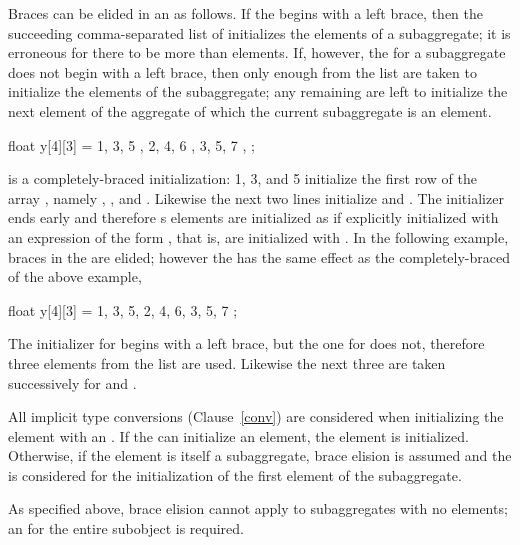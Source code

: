 \pnum
Braces can be elided in an
as follows.
If the
begins with a left brace,
then the succeeding comma-separated list of
initializes the elements of a subaggregate;
it is erroneous for there to be more
than elements.
If, however, the
for a subaggregate does not begin with a left brace,
then only enough
from the list are taken to initialize the elements of the subaggregate;
any remaining
are left to initialize the next element of the aggregate
of which the current subaggregate is an element.
\begin{example}

\begin{codeblock}
float y[4][3] = {
  { 1, 3, 5 },
  { 2, 4, 6 },
  { 3, 5, 7 },
};
\end{codeblock}

is a completely-braced initialization:
1, 3, and 5 initialize the first row of the array
,
namely
,
,
and
.
Likewise the next two lines initialize
and
.
The initializer ends early and therefore
s
elements are initialized as if explicitly initialized with an
expression of the form
,
that is, are initialized with
.
In the following example, braces in the
are elided;
however the
has the same effect as the completely-braced
of the above example,

\begin{codeblock}
float y[4][3] = {
  1, 3, 5, 2, 4, 6, 3, 5, 7
};
\end{codeblock}

The initializer for
begins with a left brace, but the one for
does not,
therefore three elements from the list are used.
Likewise the next three are taken successively for
and
.
\end{example}

\pnum
All implicit type conversions (Clause~\ref{conv}) are considered when
initializing the element with an .
If the
can initialize an element, the element is initialized.
Otherwise, if the element is itself a subaggregate,
brace elision is assumed and the
is considered for the initialization of the first element of the subaggregate.
\begin{note} As specified above, brace elision cannot apply to
subaggregates with no elements; an
 for the entire subobject is
required.\end{note}

